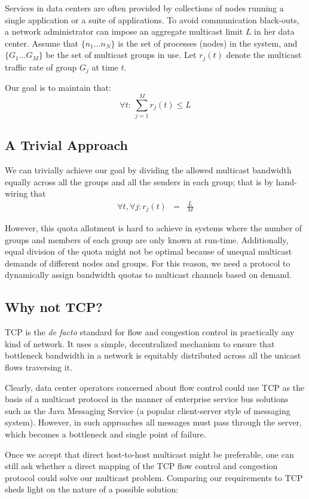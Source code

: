 Services in data centers are often provided by collections of nodes running a single application or a suite of applications. To avoid communication black-outs, a network administrator can impose an aggregate multicast limit $L$ in her data center. Assume that $\{n_1 ... n_N\}$ is the set of processes (nodes) in the system, and $\{G_1 ... G_M\}$ be the set of multicast groups in use. Let $r_j(t)$ denote the multicast traffic rate of group $G_j$ at time $t$.

Our goal is to maintain that:
\[ \forall t:\ \sum_{j = 1}^{M} r_j(t) \leq L\]

\subsection{A Trivial Approach}
We can trivially achieve our goal by dividing the allowed multicast bandwidth equally across all the groups and all the senders in each group; that is by hand-wiring that
\begin{eqnarray*}
\forall t, \forall j: r_j(t) &=& \frac{L}{M}
\end{eqnarray*}

However, this quota allotment is hard to achieve in systems where the number of groups and members of each group are only known at run-time. Additionally, equal division of the quota might not be optimal because of unequal multicast demands of different nodes and groups. For this reason, we need a protocol to dynamically assign bandwidth quotas to multicast channels based on demand.

\subsection{Why not TCP?}
TCP is the \textit{de facto} standard for flow and congestion control in practically any kind of network. It uses a simple, decentralized mechanism to ensure that bottleneck bandwidth in a network is equitably distributed across all the unicast flows traversing it.

Clearly, data center operators concerned about flow control could use TCP as the basis of a multicast protocol in the manner of enterprise service bus solutions such as the Java Messaging Service (a popular client-server style of messaging system).  However, in such approaches all messages must pass through the server, which becomes a bottleneck and single point of failure.

Once we accept that direct host-to-host multicast might be preferable, one can still ask whether a direct mapping of the TCP flow control and congestion protocol could solve our multicast problem. Comparing our requirements to TCP sheds light on the nature of a possible solution:\\

